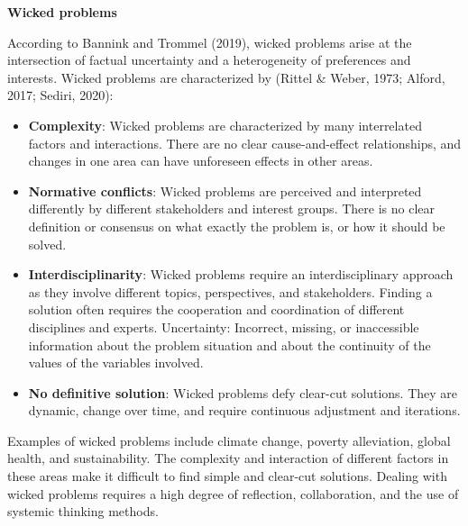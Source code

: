 \documentclass[
  a4paper,
  openany]{book}
\begin{document}
\begin{tcolorbox}[enhanced jigsaw, breakable, left=2mm, arc=.35mm, rightrule=.15mm, opacityback=0, leftrule=.75mm, bottomrule=.15mm, colback=white, toprule=.15mm, colframe=quarto-callout-note-color-frame]

\vspace{-3mm}\textbf{Wicked problems}\vspace{3mm}

According to Bannink and Trommel (2019), wicked problems arise at the
intersection of factual uncertainty and a heterogeneity of preferences
and interests. Wicked problems are characterized by (Rittel \& Weber,
1973; Alford, 2017; Sediri, 2020):

\begin{itemize}
\item
  \textbf{Complexity}: Wicked problems are characterized by many
  interrelated factors and interactions. There are no clear
  cause-and-effect relationships, and changes in one area can have
  unforeseen effects in other areas.
\item
  \textbf{Normative conflicts}: Wicked problems are perceived and
  interpreted differently by different stakeholders and interest groups.
  There is no clear definition or consensus on what exactly the problem
  is, or how it should be solved.
\item
  \textbf{Interdisciplinarity}: Wicked problems require an
  interdisciplinary approach as they involve different topics,
  perspectives, and stakeholders. Finding a solution often requires the
  cooperation and coordination of different disciplines and experts.
  Uncertainty: Incorrect, missing, or inaccessible information about the
  problem situation and about the continuity of the values of the
  variables involved.
\item
  \textbf{No definitive solution}: Wicked problems defy clear-cut
  solutions. They are dynamic, change over time, and require continuous
  adjustment and iterations.
\end{itemize}

Examples of wicked problems include climate change, poverty alleviation,
global health, and sustainability. The complexity and interaction of
different factors in these areas make it difficult to find simple and
clear-cut solutions. Dealing with wicked problems requires a high degree
of reflection, collaboration, and the use of systemic thinking methods.

\end{tcolorbox}
\end{document}
